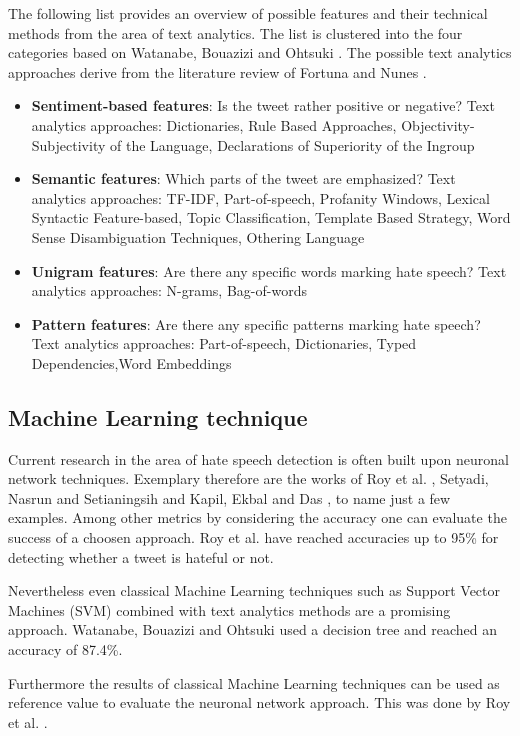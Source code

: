 The following list provides an overview of possible features and their technical methods from the area of text analytics. The list is clustered into the four categories based on Watanabe, Bouazizi and Ohtsuki \cite{8292838}. The possible text analytics approaches derive from the literature review of Fortuna and Nunes \cite{10.1145/3232676}.
\begin{itemize}
	\item \textbf{Sentiment-based features}: Is the tweet rather positive or negative? \newline
	Text analytics approaches: Dictionaries, Rule Based Approaches, Ob\-jec\-ti\-vi\-ty-Subjectivity of the Language, Declarations of Superiority of the Ingroup
	\item \textbf{Semantic features}: Which parts of the tweet are emphasized? \newline
	Text analytics approaches: TF-IDF, Part-of-speech, Profanity Windows, Lexical Syntactic Feature-based, Topic Classification, Template Based Strategy, Word Sense Disambiguation Techniques, Othering Language
	\item \textbf{Unigram features}: Are there any specific words marking hate speech? \newline
	Text analytics approaches: N-grams, Bag-of-words
	\item \textbf{Pattern features}: Are there any specific patterns marking hate speech? \newline
	Text analytics approaches: Part-of-speech, Dictionaries, Typed De\-pen\-den\-cies,Word Embeddings
\end{itemize}


\subsection{Machine Learning technique}

Current research in the area of hate speech detection is often built upon neuronal network techniques. Exemplary therefore are the works of Roy et al. \cite{9253658}, Setyadi, Nasrun and Setianingsih \cite{8712109} and Kapil, Ekbal and Das \cite{kapil2020investigating}, to name just a few examples. Among other metrics by considering the accuracy one can evaluate the success of a choosen approach. Roy et al. \cite{9253658} have reached accuracies up to 95\% for detecting whether a tweet is hateful or not.

Nevertheless even classical Machine Learning techniques such as Support Vector Machines (SVM) combined with text analytics methods are a promis\-ing approach.
Watanabe, Bouazizi and Ohtsuki \cite{8292838} used a decision tree and reached an accuracy of 87.4\%.

Furthermore the results of classical Machine Learning techniques can be used as reference value to evaluate the neuronal network approach. This was done by Roy et al. \cite{9253658}.
